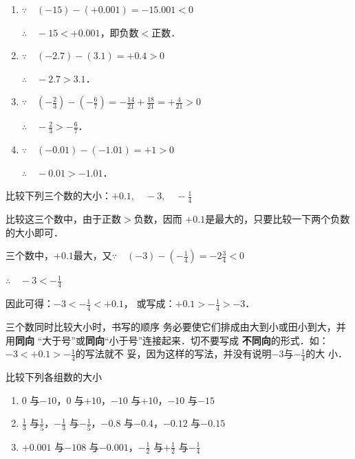 \begin{solution}
\begin{enumerate}
    \item $\because\quad (-15)-(+0.001)=-15.001<0$

$\therefore\quad -15<+0.001$，即负数$<$正数．

\item $\because\quad (-2.7)-(3.1)=+0.4>0$

$\therefore\quad -2.7>3.1$．

\item $\because\quad \left(-\frac{2}{3}\right)-\left(-\frac{6}{7}\right)=-\frac{14}{21}+\frac{18}{21}=+\frac{4}{21}>0$

$\therefore\quad -\frac{2}{3}>-\frac{6}{7}$．

\item $\because\quad (-0.01)-(-1.01)=+1>0$

$\therefore\quad -0.01>-1.01$．
\end{enumerate}    
\end{solution}

\begin{example}
比较下列三个数的大小：$+0.1,\quad -3,\quad -\frac{1}{4}$
\end{example}

\begin{analyze}
比较这三个数中，由于正数$>$负数，因而
$+0.1$是最大的，只要比较一下两个负数的大小即可．
\end{analyze}

\begin{solution}
    三个数中，$+0.1$最大，又$\because\quad (-3)-\left(-\frac{1}{4}\right)=-2\frac{3}{4}<0$

    $\therefore\quad -3<-\frac{1}{4}$

    因此可得：$-3<-\frac{1}{4}<+0.1$，
    或写成：$+0.1>-\frac{1}{4}>-3$．
\end{solution}

\begin{rmk}
三个数同时比较大小时，书写的顺序
务必要使它们排成由大到小或田小到大，并用\textbf{同向}
“大于号”或\textbf{同向}“小于号”连接起来．切不要写成
\textbf{不同向}的形式．如：$-3<+0.1>-\frac{1}{4}$的写法就不
妥，因为这样的写法，并没有说明$-3$与$-\frac{1}{4}$的大
小．
\end{rmk}

\begin{ex}
    比较下列各组数的大小
\begin{enumerate}
    \item $0$ 与$-10$，\quad $0$ 与$+10$，\quad $-10$ 与$+10$，\quad $-10$ 与$-15$
    \item $\frac{1}{3}$ 与$\frac{1}{5}$，\quad $-\frac{1}{3}$ 与$-\frac{1}{5}$，\quad $-0.8$ 与$-0.4$，\quad $-0.12$ 与$-0.15$
    \item $+0.001$ 与$-108$ 与$-0.001$，\quad $-\frac{1}{2}$ 与$+\frac{1}{2}$ 与$-\frac{1}{4}$
\end{enumerate}
\end{ex}

